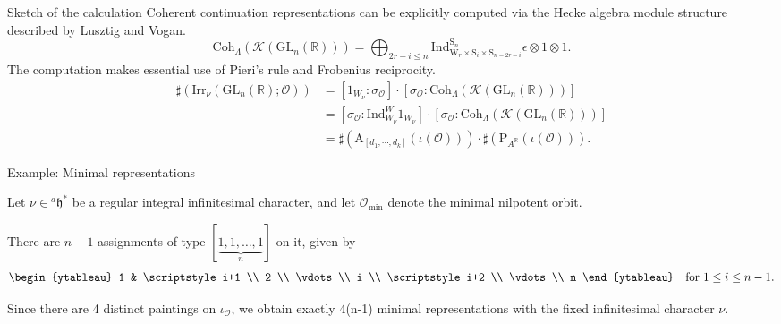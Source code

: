 \documentclass[fleqn,xcolor=dvipsnames]{beamer}
\newcommand{\BR}{{\mathbb {R}}}
\newcommand{\CK}{{\mathcal {K}}}
\newcommand{\CO}{{\mathcal {O}}}
\newcommand{\RA}{{\mathrm {A}}}
\newcommand{\GL}{{\mathrm{GL}}}
\newcommand{\Ind}{{\mathrm{Ind}}}
\newcommand{\Irr}{{\mathrm{Irr}}}
\begin{document}
\begin{frame}{Sketch of the calculation}
  Coherent continuation representations can be explicitly computed via the Hecke algebra module structure described by Lusztig and Vogan.
  \begin{equation*}
    \mathrm{Coh}_{\Lambda}(\CK(\GL_{n}(\BR))) = \bigoplus_{2r + i \leq n} \Ind _{\mathrm{W}_{r} \times \mathrm{S}_{i} \times \mathrm{S}_{n-2r-i}}^{\mathrm{S}_{n}} \epsilon \otimes 1 \otimes 1.
  \end{equation*}
  \pause The computation makes essential use of \alert{Pieri's rule and Frobenius reciprocity}.
  \begin{align*}
    \sharp(\Irr_\nu(\GL_{n}(\BR);\CO)) &= [1_{W_\nu}:\sigma_{\CO}] \cdot [\sigma_{\CO}:\mathrm{Coh}_{\Lambda}(\CK(\GL_{n}(\BR)))]\\
    &= [\sigma_{\CO}:\Ind_{W_{\nu}}^{W}1_{W_{\nu}}] \cdot [\sigma_{\CO}:\mathrm{Coh}_{\Lambda}(\CK(\GL_{n}(\BR)))]\\
    & =  \sharp\left(\RA_{[d_1,\cdots,d_k]}(\iota(\CO))\right) \cdot \sharp\left(\mathrm{P}_{A^{\BR}}(\iota(\CO))\right).
  \end{align*}
\end{frame}






\begin{frame}{Example: Minimal representations}

Let \( \nu \in {^a\mathfrak{h}}^* \) be a regular integral infinitesimal character, and let \( \mathcal{O}_{\mathrm{min}} \) denote the \alert{minimal nilpotent orbit}.

\medskip

There are \( n-1 \) assignments of type \( [\underbrace{1, 1, \dots, 1}_n] \) on it, given by
\[
\begin{ytableau}
    1 & \scriptstyle i+1 \\
    2 \\
    \vdots \\
    i \\
    \scriptstyle i+2 \\
    \vdots \\
    n
\end{ytableau}
\quad \text{for } 1 \leq i \leq n-1.
\]

\medskip

\pause Since there are 4 distinct paintings on $\iota_{\CO}$, we obtain exactly \alert{4(n-1) minimal representations}   with the fixed infinitesimal character \( \nu \).

\end{frame}
\end{document}
